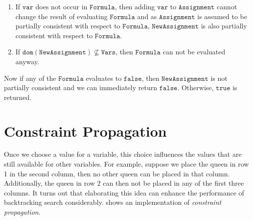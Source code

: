 \begin{enumerate}
\begin{enumerate}
      \item If $\mathtt{var}$ does not occur in $\mathtt{Formula}$, then adding $\mathtt{var}$ to
            $\mathtt{Assignment}$ cannot change the result of evaluating $\mathtt{Formula}$ and as
            $\mathtt{Assignment}$ is assumed to be partially consistent with respect to $\mathtt{Formula}$, 
            $\mathtt{NewAssignment}$ is also partially consistent with respect to $\mathtt{Formula}$.
      \item If $\mathtt{dom}(\mathtt{NewAssignment}) \not\subseteq \mathtt{Vars}$, then $\mathtt{Formula}$ can not be evaluated anyway.
      \end{enumerate}
      Now if any of the $\mathtt{Formula}$ evaluates to $\mathtt{false}$, then $\mathtt{NewAssignment}$ is not
      partially consistent and we can immediately return $\mathtt{false}$.  Otherwise, $\mathtt{true}$ is returned.
\end{enumerate}  

\section{Constraint Propagation}
Once we choose a value for a variable, this choice influences the values that are still available for other variables.
For example, suppose we place the queen in row 1 in the second column, then no other queen can be placed in
that column.   Additionally, the queen in row 2 can then not be placed in any of the first three columns.
It turns out that elaborating this idea can enhance the performance of backtracking search considerably.
 shows an implementation of \emph{\color{blue}constraint propagation}.

